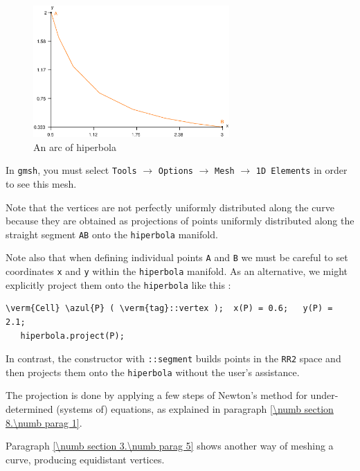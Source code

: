 \begin{figure} \centering
  \includegraphics[width=75mm]{hiperbola}
  \caption{An arc of hiperbola}
  \label{\numb section 2.\numb fig 3}
\end{figure}

In {\tt gmsh}, you must select {\small\tt Tools} $\to$ {\small\tt Options} $\to$
{\small\tt Mesh} $\to$ {\small\tt 1D Elements} in order to see this mesh.

Note that the vertices are not perfectly uniformly distributed along the curve
because they are obtained as projections of points uniformly distributed along
the straight segment {\small\tt AB} onto the {\small\tt hiperbola} manifold.

Note also that when defining individual points {\small\tt A} and {\small\tt B} we must
be careful to set coordinates {\small\tt x} and {\small\tt y} within
the {\small\tt hiperbola} manifold.
As an alternative, we might explicitly project them onto the {\small\tt hiperbola} like this :

\begin{Verbatim}[commandchars=\\\{\},formatcom=\small\tt,baselinestretch=0.94]
   \verm{Cell} \azul{P} ( \verm{tag}::vertex );  x(P) = 0.6;   y(P) = 2.1;
   hiperbola.project(P);
\end{Verbatim}

\noindent In contrast, the {\small\tt {}} constructor with {\small\tt {}::segment}
builds points in the {\small\tt RR2} space and then projects them onto the
{\small\tt hiperbola} without the user's assistance.

The projection is done by applying a few steps of Newton's method for under-determined
(systems of) equations, as explained in paragraph \ref{\numb section 8.\numb parag 1}.

Paragraph \ref{\numb section 3.\numb parag 5} shows another way of meshing a curve,
producing equidistant vertices.


